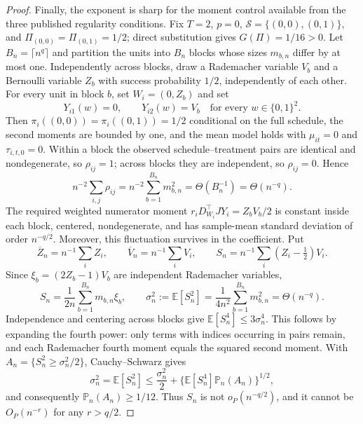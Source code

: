 \documentclass{article}
\begin{document}
\begin{proof}
Finally, the exponent is sharp for the moment control available from the three published regularity conditions. Fix \(T=2\), \(p=0\), \(\mathcal S=\{(0,0),(0,1)\}\), and \(\Pi_{(0,0)}=\Pi_{(0,1)}=1/2\); direct substitution gives \(G(\Pi)=1/16>0\). Let \(B_n=\lceil n^q\rceil\) and partition the units into \(B_n\) blocks whose sizes \(m_{b,n}\) differ by at most one. Independently across blocks, draw a Rademacher variable \(V_b\) and a Bernoulli variable \(Z_b\) with success probability \(1/2\), independently of each other. For every unit in block \(b\), set \(W_i=(0,Z_b)\) and set
\[
Y_{i1}(w)=0,\qquad Y_{i2}(w)=V_b
\quad\text{for every }w\in\{0,1\}^2.
\]
Then \(\pi_i((0,0))=\pi_i((0,1))=1/2\) conditional on the full schedule, the second moments are bounded by one, and the mean model holds with \(\mu_{it}=0\) and \(\tau_{i,t,0}=0\). Within a block the observed schedule--treatment pairs are identical and nondegenerate, so \(\rho_{ij}=1\); across blocks they are independent, so \(\rho_{ij}=0\). Hence
\[
n^{-2}\sum_{i,j}\rho_{ij}
=n^{-2}\sum_{b=1}^{B_n}m_{b,n}^2
=\Theta(B_n^{-1})=\Theta(n^{-q}).
\]
The required weighted numerator moment
\(r_iD_{W_i}^{\top}JY_i=Z_bV_b/2\) is constant inside each block, centered, nondegenerate, and has sample-mean standard deviation of order \(n^{-q/2}\). Moreover, this fluctuation survives in the coefficient. Put
\[
\overline Z_n=n^{-1}\sum_iZ_i,\qquad
\overline V_n=n^{-1}\sum_iV_i,\qquad
S_n=n^{-1}\sum_i(Z_i-\tfrac12)V_i.
\]
Since \(\xi_b=(2Z_b-1)V_b\) are independent Rademacher variables,
\[
S_n=\frac{1}{2n}\sum_{b=1}^{B_n}m_{b,n}\xi_b,
\qquad
\sigma_n^2:=\mathbb E[S_n^2]
=\frac{1}{4n^2}\sum_{b=1}^{B_n}m_{b,n}^2
=\Theta(n^{-q}).
\]
Independence and centering across blocks give
\(\mathbb E[S_n^4]\leq3\sigma_n^4\). This follows by expanding the fourth power: only terms with indices occurring in pairs remain, and each Rademacher fourth moment equals the squared second moment. With
\(A_n=\{S_n^2\geq\sigma_n^2/2\}\), Cauchy--Schwarz gives
\[
\sigma_n^2=\mathbb E[S_n^2]
\leq \frac{\sigma_n^2}{2}
  +\{\mathbb E[S_n^4]\mathbb P_n(A_n)\}^{1/2},
\]
and consequently \(\mathbb P_n(A_n)\geq1/12\). Thus
\(S_n\) is not \(o_P(n^{-q/2})\), and it cannot be \(O_P(n^{-r})\) for any \(r>q/2\).


\end{proof}
\end{document}
